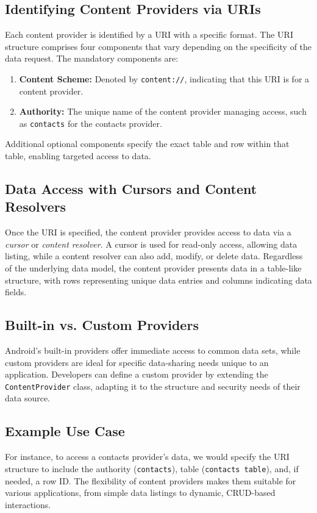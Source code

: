 \documentclass{article}
\begin{document}
\subsection{Identifying Content Providers via URIs}
Each content provider is identified by a URI with a specific format. The URI structure comprises four components that vary depending on the specificity of the data request. The mandatory components are:
\begin{enumerate}
    \item \textbf{Content Scheme:} Denoted by \texttt{content://}, indicating that this URI is for a content provider.
    \item \textbf{Authority:} The unique name of the content provider managing access, such as \texttt{contacts} for the contacts provider.
\end{enumerate}
Additional optional components specify the exact table and row within that table, enabling targeted access to data.

\subsection{Data Access with Cursors and Content Resolvers}
Once the URI is specified, the content provider provides access to data via a \textit{cursor} or \textit{content resolver}. A cursor is used for read-only access, allowing data listing, while a content resolver can also add, modify, or delete data. Regardless of the underlying data model, the content provider presents data in a table-like structure, with rows representing unique data entries and columns indicating data fields.

\subsection{Built-in vs. Custom Providers}
Android's built-in providers offer immediate access to common data sets, while custom providers are ideal for specific data-sharing needs unique to an application. Developers can define a custom provider by extending the \texttt{ContentProvider} class, adapting it to the structure and security needs of their data source.

\subsection{Example Use Case}
For instance, to access a contacts provider's data, we would specify the URI structure to include the authority (\texttt{contacts}), table (\texttt{contacts table}), and, if needed, a row ID. The flexibility of content providers makes them suitable for various applications, from simple data listings to dynamic, CRUD-based interactions.
\end{document}
